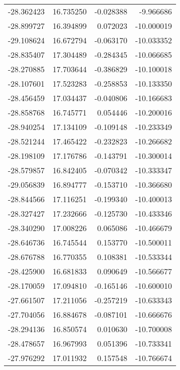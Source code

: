 \begin{tabular}{rrrr}
      -28.362423 &        16.735250 &   -0.028388 &  -9.966686 \\
      -28.899727 &        16.394899 &    0.072023 & -10.000019 \\
      -29.108624 &        16.672794 &   -0.063170 & -10.033352 \\
      -28.835407 &        17.304489 &   -0.284345 & -10.066685 \\
      -28.270885 &        17.703644 &   -0.386829 & -10.100018 \\
      -28.107601 &        17.523283 &   -0.258853 & -10.133350 \\
      -28.456459 &        17.034437 &   -0.040806 & -10.166683 \\
      -28.858768 &        16.745771 &    0.054446 & -10.200016 \\
      -28.940254 &        17.134109 &   -0.109148 & -10.233349 \\
      -28.521244 &        17.465422 &   -0.232823 & -10.266682 \\
      -28.198109 &        17.176786 &   -0.143791 & -10.300014 \\
      -28.579857 &        16.842405 &   -0.070342 & -10.333347 \\
      -29.056839 &        16.894777 &   -0.153710 & -10.366680 \\
      -28.844566 &        17.116251 &   -0.199340 & -10.400013 \\
      -28.327427 &        17.232666 &   -0.125730 & -10.433346 \\
      -28.340290 &        17.008226 &    0.065086 & -10.466679 \\
      -28.646736 &        16.745544 &    0.153770 & -10.500011 \\
      -28.676788 &        16.770355 &    0.108381 & -10.533344 \\
      -28.425900 &        16.681833 &    0.090649 & -10.566677 \\
      -28.170059 &        17.094810 &   -0.165146 & -10.600010 \\
      -27.661507 &        17.211056 &   -0.257219 & -10.633343 \\
      -27.704056 &        16.884678 &   -0.087101 & -10.666676 \\
      -28.294136 &        16.850574 &    0.010630 & -10.700008 \\
      -28.478657 &        16.967993 &    0.051396 & -10.733341 \\
      -27.976292 &        17.011932 &    0.157548 & -10.766674 \\

\end{tabular}
